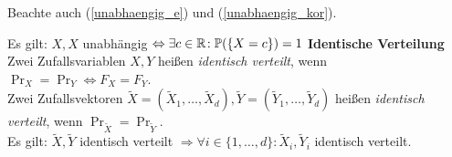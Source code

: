 Beachte auch (\ref{unabhaengig_e}) und (\ref{unabhaengig_kor}).

Es gilt: $X,X$ unabhängig $\Leftrightarrow \exists c\in\mathbb{R}\!: \mathbb{P}(\{X=c\}) = 1$ \U

\textbf{Identische Verteilung}\\
Zwei Zufallsvariablen $X,Y$ heißen \textit{identisch verteilt},
wenn $\Pr_X = \Pr_Y \Leftrightarrow F_X = F_Y$.\\
Zwei Zufallsvektoren
$\tilde{X} = (\tilde{X}_1,\ldots,\tilde{X}_d),
\tilde{Y} = (\tilde{Y}_1,\ldots,\tilde{Y}_d)$
heißen \textit{identisch verteilt}, wenn
$\Pr_{\tilde{X}} = \Pr_{\tilde{Y}}$.\\
Es gilt: $\tilde{X},\tilde{Y}$ identisch verteilt
$\Rightarrow \forall i\in\{1,\ldots,d\}\!: \tilde{X}_i,\tilde{Y}_i$ identisch verteilt.

